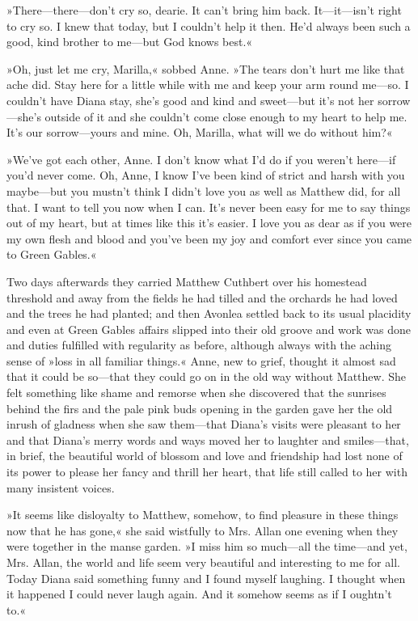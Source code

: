 »There—there—don’t cry so, dearie. It can’t bring him back. It—it—isn’t right to cry so. I knew that today, but I couldn’t help it then. He’d always been such a good, kind brother to me—but God knows best.«

»Oh, just let me cry, Marilla,« sobbed Anne. »The tears don’t hurt me like that ache did. Stay here for a little while with me and keep your arm round me—so. I couldn’t have Diana stay, she’s good and kind and sweet—but it’s not her sorrow—she’s outside of it and she couldn’t come close enough to my heart to help me. It’s our sorrow—yours and mine. Oh, Marilla, what will we do without him?«

»We’ve got each other, Anne. I don’t know what I’d do if you weren’t here—if you’d never come. Oh, Anne, I know I’ve been kind of strict and harsh with you maybe—but you mustn’t think I didn’t love you as well as Matthew did, for all that. I want to tell you now when I can. It’s never been easy for me to say things out of my heart, but at times like this it’s easier. I love you as dear as if you were my own flesh and blood and you’ve been my joy and comfort ever since you came to Green Gables.«

Two days afterwards they carried Matthew Cuthbert over his homestead threshold and away from the fields he had tilled and the orchards he had loved and the trees he had planted; and then Avonlea settled back to its usual placidity and even at Green Gables affairs slipped into their old groove and work was done and duties fulfilled with regularity as before, although always with the aching sense of »loss in all familiar things.« Anne, new to grief, thought it almost sad that it could be so—that they could go on in the old way without Matthew. She felt something like shame and remorse when she discovered that the sunrises behind the firs and the pale pink buds opening in the garden gave her the old inrush of gladness when she saw them—that Diana’s visits were pleasant to her and that Diana’s merry words and ways moved her to laughter and smiles—that, in brief, the beautiful world of blossom and love and friendship had lost none of its power to please her fancy and thrill her heart, that life still called to her with many insistent voices.

»It seems like disloyalty to Matthew, somehow, to find pleasure in these things now that he has gone,« she said wistfully to Mrs. Allan one evening when they were together in the manse garden. »I miss him so much—all the time—and yet, Mrs. Allan, the world and life seem very beautiful and interesting to me for all. Today Diana said something funny and I found myself laughing. I thought when it happened I could never laugh again. And it somehow seems as if I oughtn’t to.«


